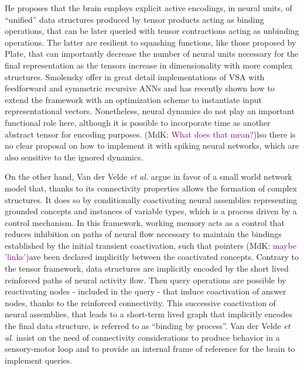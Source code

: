 \documentclass[10pt]{article}
\newcommand{\notenewMdK}[2]{(MdK: \textcolor{purple}{#1})}
\begin{document}
He proposes that the brain employs explicit active encodings, in neural units, of ``unified'' data structures produced by tensor products acting as binding operations, 
that can be later queried with tensor contractions acting as unbinding operations.
The latter are resilient to squashing functions, like those proposed by Plate, that can importantly decrease the number of neural units necessary for the final 
representation as the tensors increase in dimensionality with more complex structures.
Smolensky offer in great detail implementations of VSA with feedforward and symmetric recursive ANNs\cite{smolensky2006harmonic} and has recently shown 
how to extend the framework with an optimization scheme to instantiate input representational vectors\cite{Smolensky_2013}.
Nonetheless, neural dynamics do not play an important functional role here, although it is possible to incorporate time as another abstract tensor for encoding purposes.
\notenewMdK{What does that mean?}
Also there is no clear proposal on how to implement it with spiking neural networks, which are also sensitive to the ignored dynamics.

On the other hand, Van der Velde \emph {et al.} \cite{van_der_Velde_2015} argue in favor of a small world network model that, thanks to its connectivity properties 
allows the formation of complex structures.
It does so by conditionally coactivating neural assemblies representing grounded concepts and instances of variable types, which is a process driven by a control mechanism.
In this framework, working memory acts as a control that reduces inhibition on paths of neural flow necessary to maintain the bindings 
established by the initial transient coactivation, such that pointers \notenewMdK{maybe 'links'} have been  declared implicitly between the coactivated concepts.
Contrary to the tensor framework, data structures are implicitly encoded by the short lived reinforced paths of neural activity flow.
Then query operations are possible by reactivating nodes - included in the query - that induce coactivation of answer nodes, thanks to the reinforced connectivity.
This successive coactivation of neural assemblies, that leads to a short-term lived graph that implicitly encodes the final data structure, 
is referred to as ``binding by process''.
Van der Velde \emph{et al.} insist on the need of connectivity considerations to produce behavior in a sensory-motor loop and to provide an internal frame of reference for the brain to implement queries.
\end{document}
